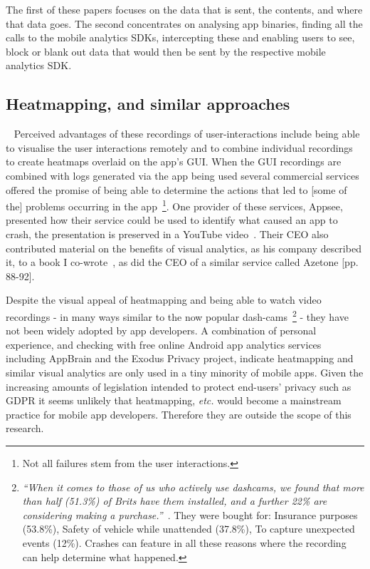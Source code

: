 The first of these papers focuses on the data that is sent, the contents, and where that data goes. The second concentrates on analysing app binaries, finding all the calls to the mobile analytics SDKs, intercepting these and enabling users to see, block or blank out data that would then be sent by the respective mobile analytics SDK.

\subsection{Heatmapping, and similar approaches}~\label{section-heatmapping} 
Perceived advantages of these recordings of user-interactions include being able to visualise the user interactions remotely and to combine individual recordings to create heatmaps overlaid on the app's GUI. When the GUI recordings are combined with logs generated via the app being used several commercial services offered the promise of being able to determine the actions that led to [some of the] problems occurring in the app~\footnote{Not all failures stem from the user interactions.}. One provider of these services, Appsee, presented how their service could be used to identify what caused an app to crash, the presentation is preserved in a YouTube video~\citep{appsee2015_youtube_visual_analytics_budapest_mobile_meetup}. Their CEO also contributed material on the benefits of visual analytics, as his company described it, to a book I co-wrote~\citep[pp. 94-95]{harty_aymer_playbook_2016}, as did the CEO of a similar service called Azetone [pp. 88-92]. %

Despite the visual appeal of heatmapping and being able to watch video recordings - in many ways similar to the now popular dash-cams~\footnote{\emph{``When it comes to those of us who actively use dashcams, we found that more than half (51.3\%) of Brits have them installed, and a further 22\% are considering making a purchase.''}~\citet{vardy2018_a_survey_of_dashcams_in_uk_cars}. They were bought for: Insurance purposes (53.8\%), Safety of vehicle while unattended (37.8\%), To capture unexpected events (12\%). Crashes can feature in all these reasons where the recording can help determine what happened.} - they have not been widely adopted by app developers. A combination of personal experience, and checking with free online Android app analytics services including AppBrain and the Exodus Privacy project, indicate heatmapping and similar visual analytics are only used in a tiny minority of mobile apps. Given the increasing amounts of legislation intended to protect end-users' privacy such as GDPR it seems unlikely that heatmapping, \textit{etc.} would become a mainstream practice for mobile app developers. Therefore they are outside the scope of this research.

